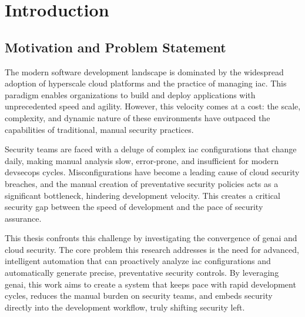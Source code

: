 
\chapter{Introduction}
\label{chap:introduction}


\newcommand{\keyword}[1]{\textbf{#1}}
\newcommand{\tabhead}[1]{\textbf{#1}}
\newcommand{\code}[1]{\texttt{#1}}
\newcommand{\file}[1]{\texttt{\bfseries#1}}
\newcommand{\option}[1]{\texttt{\itshape#1}}


\section{Motivation and Problem Statement}
\label{sec:motivation_problem}

The modern software development landscape is dominated by the widespread adoption of hyperscale cloud platforms and the practice of managing \gls{iac}. This paradigm enables organizations to build and deploy applications with unprecedented speed and agility. However, this velocity comes at a cost: the scale, complexity, and dynamic nature of these environments have outpaced the capabilities of traditional, manual security practices\cite{khanna_enhancing_2024}.

Security teams are faced with a deluge of complex \gls{iac} configurations that change daily, making manual analysis slow, error-prone, and insufficient for modern \gls{devsecops} cycles\cite{gunathilaka_context-aware_2025}. Misconfigurations have become a leading cause of cloud security breaches, and the manual creation of preventative security policies acts as a significant bottleneck, hindering development velocity\cite{tunc_cloud_2017, fu_ai_2025}. This creates a critical security gap between the speed of development and the pace of security assurance.

This thesis confronts this challenge by investigating the convergence of \gls{genai} and cloud security. The core problem this research addresses is the need for advanced, intelligent automation that can proactively analyze \gls{iac} configurations and automatically generate precise, preventative security controls. By leveraging \gls{genai}, this work aims to create a system that keeps pace with rapid development cycles, reduces the manual burden on security teams, and embeds security directly into the development workflow, truly shifting security left.

